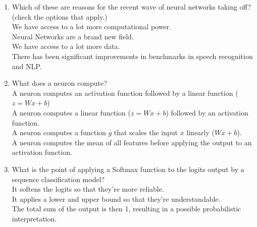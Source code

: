 \begin{enumerate}
    \item Which of these are reasons for the recent wave of neural networks taking off? (check the options that apply.) \\ 
        \hspace{1cm}\checkmark{} We have access to a lot more computational power.\\
        \hspace{1cm}\choice{} Neural Networks are a brand new field.\\
        \hspace{1cm}\checkmark{} We have access to a lot more data.\\
        \hspace{1cm}\checkmark{} There has been significant improvements in benchmarks in speech recognition and NLP.\\
        \solution{}
    \item What does a neuron compute? \\ 
        \hspace{1cm}\choice{} A neuron computes an activation function followed by a linear function ($z = Wx + b$)\\
        \hspace{1cm}\checkmark{} A neuron computes a linear function ($z = Wx + b$) followed by an activation function.\\
        \hspace{1cm}\choice{} A neuron computes a function $g$ that scales the input $x$ linearly ($Wx + b$).\\
        \hspace{1cm}\choice{} A neuron computes the mean of all features before applying the output to an activation function.\\
        \solution{}

    \item  What is the point of applying a Softmax function to the logits output by a sequence classification model? \\ 
        \hspace{1cm}\checkmark{} It softens the logits so that they're more reliable. \\ 
        \hspace{1cm}\checkmark{} It applies a lower and upper bound so that they're understandable. \\ 
        \hspace{1cm}\checkmark{} The total sum of the output is then 1, resulting in a possible probabilistic interpretation.\\
        \solution{}
    
\end{enumerate}

